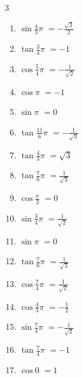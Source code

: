 \begin{multicols}{3}
\begin{enumerate}
  \item $\displaystyle \sin{\frac{4}{3}\pi}$
        $\displaystyle =-\frac{\sqrt{3}}{2}$

  \item $\displaystyle \tan{\frac{3}{4}\pi}$
        $\displaystyle =-1$

  \item $\displaystyle \cos{\frac{5}{4}\pi}$
        $\displaystyle =-\frac{1}{\sqrt{2}}$

  \item $\displaystyle \cos{\pi}$
        $\displaystyle =-1$

  \item $\displaystyle \sin{\pi}$
        $\displaystyle =0$

  \item $\displaystyle \tan{\frac{11}{6}\pi}$
        $\displaystyle =-\frac{1}{\sqrt{3}}$

  \item $\displaystyle \tan{\frac{4}{3}\pi}$
        $\displaystyle =\sqrt{3}$

  \item $\displaystyle \tan{\frac{7}{6}\pi}$
        $\displaystyle =\frac{1}{\sqrt{3}}$

  \item $\displaystyle \cos{\frac{\pi}{2}}$
        $\displaystyle =0$

  \item $\displaystyle \sin{\frac{3}{4}\pi}$
        $\displaystyle =\frac{1}{\sqrt{2}}$

  \item $\displaystyle \sin{\pi}$
        $\displaystyle =0$

  \item $\displaystyle \tan{\frac{7}{6}\pi}$
        $\displaystyle =\frac{1}{\sqrt{3}}$

  \item $\displaystyle \cos{\frac{7}{4}\pi}$
        $\displaystyle =\frac{1}{\sqrt{2}}$

  \item $\displaystyle \cos{\frac{4}{3}\pi}$
        $\displaystyle =-\frac{1}{2}$

  \item $\displaystyle \sin{\frac{7}{4}\pi}$
        $\displaystyle =-\frac{1}{\sqrt{2}}$

  \item $\displaystyle \tan{\frac{7}{4}\pi}$
        $\displaystyle =-1$

  \item $\displaystyle \cos{0}$
        $\displaystyle =1$


\end{enumerate}
\end{multicols}
